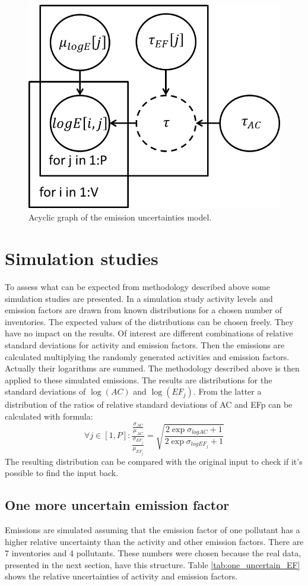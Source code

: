 \documentclass{article}
\begin{document}
\begin{figure}
    \includegraphics[width=4.5in]{acyclic_model_graph.png}
    \caption{Acyclic graph of the emission uncertainties model.}
    \label{fig:graph}
\end{figure}

\section{Simulation studies}
To assess what can be expected from methodology described above some simulation studies are presented. In a simulation study activity levels and emission factors are drawn from known distributions for a chosen number of inventories. The expected values of the distributions can be chosen freely. They have no impact on the results. Of interest are different combinations of relative standard deviations for activity and emission factors. Then the emissions are calculated multiplying the randomly generated activities and emission factors. Actually their logarithms are summed. The methodology described above is then applied to these simulated emissions. The results are distributions for the standard deviations of \(\log(AC)\) and \(\log(EF_{j})\). From the latter a distribution of the ratios of relative standard deviations of AC and EFp can be calculated with formula:
\[\forall j \in [1,P]:  \frac{\frac{\sigma_{AC}}{\mu_{AC}}}{\frac{\sigma_{EF_{j}}}{\mu_{EF_{j}}}} = \sqrt{\frac{2\exp{\sigma_{logAC}}+1}{2\exp{\sigma_{logEF_{j}}}+1}}\]
The resulting distribution can be compared with the original input to check if it’s possible to find the input back.

\subsection{One more uncertain emission factor}
Emissions are simulated assuming that the emission factor of one pollutant has a higher relative uncertainty than the activity and other emission factors. There are 7 inventories and 4 pollutants. These numbers were chosen because the real data, presented in the next section, have this structure. Table \ref{tab:one_uncertain_EF} shows the relative uncertainties of activity and emission factors.
\end{document}
